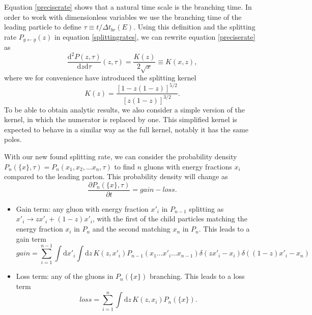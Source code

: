 \documentclass[a4paper,12pt]{article}
\newcommand{\party}[2]{\frac{\partial{#1}}{\partial{#2}}}
\numberwithin{equation}{section}
\begin{document}
Equation \eqref{preciserate} shows that a natural time scale is the branching time. In order to work with dimensionless variables we use the branching time of the leading particle to define $\tau \equiv t/\Delta t_{br}(E)$. Using this definition and the splitting rate $P_{g \leftarrow g}(z)$ in equation \eqref{splittingrates}, we can rewrite equation \eqref{preciserate} as
\begin{equation}\label{ratewithkernel}
\frac{\mathrm{d}^2 P(z,\tau)}{\mathrm{d}z\mathrm{d}\tau}(z,\tau)=\frac{K(z)}{2 \sqrt{x}} \equiv K(x,z),
\end{equation}
where we for convenience have introduced the splitting kernel
\begin{equation}\label{kernel}
K(z)=\frac{[1-z(1-z)]^{5/2}}{[z(1-z)]^{3/2}}.
\end{equation}
To be able to obtain analytic results, we also consider a simple version of the kernel, in which the numerator is replaced by one. This simplified kernel is expected to behave in a similar way as the full kernel, notably it has the same poles.

With our new found splitting rate, we can consider the probability density ${P_n(\{x\},\tau)}=P_n(x_1,x_2,...x_n,\tau)$ to find $n$ gluons with energy fractions $x_i$ compared to the leading parton. This probability density will change as
\begin{equation}\label{Pevo}
\party{P_n(\{x\},\tau)}{t}=gain-loss.
\end{equation}
\begin{itemize}
\item Gain term: any gluon with energy fraction $x'_i$ in $P_{n-1}$ splitting as $x'_i \rightarrow z x'_i + (1-z)x'_i$, with the first of the child particles matching the energy fraction $x_i$ in $P_n$ and the second matching $x_n$ in $P_n$. This leads to a gain term 
\begin{equation}
gain=\sum_{i=1}^{n-1} \int \mathrm{d}x'_i \int \mathrm{d}z\, K(z,x'_i) P_{n-1}(x_1...x'_i...x_{n-1}) \delta(zx'_i-x_i)\delta((1-z)x'_i-x_n)
\end{equation}
\item Loss term: any of the gluons in $P_n(\{x\})$ branching. This leads to a loss term
\begin{equation}
loss=\sum_{i=1}^n \int \mathrm{d}z\, K(z,x_i) P_n(\{x\}).
\end{equation}
\end{itemize} 
\end{document}
